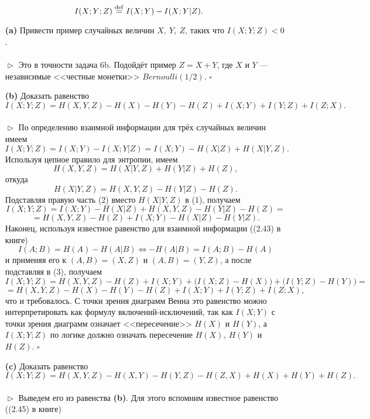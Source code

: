 \documentclass{article}
\begin{document}
\begin{enumerate}
$$I(X; Y; Z) \overset{\rm def}{=} I(X; Y) - I(X; Y | Z).$$
\begin{enumerate}
\item[\bfseries (a)] Привести пример случайных величин $X,\ Y,\ Z$, таких что $I(X; Y; Z) < 0$.
\\\\$\vartriangleright$ Это в точности задача 6b. Подойдёт пример $Z = X + Y$, где $X$ и $Y$ --- независимые <<честные монетки>> $Bernoulli(1/2)$. $\square$
\\
\item[\bfseries (b)] Доказать равенство $I(X; Y; Z) = H(X, Y, Z) - H(X) - H(Y) - H(Z) + I(X; Y) + I(Y; Z) + I(Z; X).$
\\\\$\vartriangleright$ По определению взаимной информации для трёх случайных величин имеем
\begin{equation} I(X; Y; Z) = I(X; Y) - I(X; Y | Z) = I(X; Y) - H(X|Z) + H(X|Y, Z). \end{equation}
Используя цепное правило для энтропии, имеем
$$H(X, Y, Z) = H(X|Y, Z) + H(Y | Z) + H(Z),$$ откуда
\begin{equation} H(X | Y, Z) = H(X, Y, Z) - H(Y|Z) - H(Z).\end{equation}
Подставляя правую часть (2) вместо $ H(X | Y, Z)$ в (1), получаем
$$I(X; Y; Z) = I(X; Y) - H(X|Z) + H(X, Y, Z) - H(Y|Z) - H(Z) =$$
\newpage
\begin{equation} = H(X, Y, Z) - H(Z) + I(X; Y) - H(X|Z) - H(Y|Z). \end{equation}
Наконец, используя известное равенство для взаимной информации ((2.43) в книге)
$$I(A; B) = H(A) - H(A|B) \Longleftrightarrow -H(A|B) = I(A; B) - H(A)$$  и применяя его к $(A, B) = (X, Z)$ и $(A, B) = (Y, Z)$, а после подставляя в (3), получаем
$$I(X; Y; Z) = H(X, Y, Z) - H(Z) + I(X; Y) + \Big(I(X; Z) - H(X)\Big) + \Big(I(Y; Z) - H(Y)\Big) =$$
$$= H(X, Y, Z) - H(X) - H(Y) - H(Z) + I(X; Y) + I(Y; Z) + I(Z; X),$$
что и требовалось. С точки зрения диаграмм Венна это равенство можно интерпретировать как формулу включений-исключений, так как $I(X; Y)$ с точки зрения диаграмм означает <<пересечение>> $H(X)$ и $H(Y)$, а $I(X; Y; Z)$ по логике должно означать пересечение $H(X),\ H(Y)$ и $H(Z)$. $\square$
\\
\item[\bfseries (c)] Доказать равенство $I(X; Y; Z) = H(X, Y, Z) - H(X, Y) - H(Y, Z) - H(Z, X) + H(X) + H(Y) + H(Z).$
\\\\$\vartriangleright$ Выведем его из равенства {\bfseries (b)}. Для этого вспомним известное равенство ((2.45) в книге)

\end{enumerate}
\end{enumerate}
\end{document}
